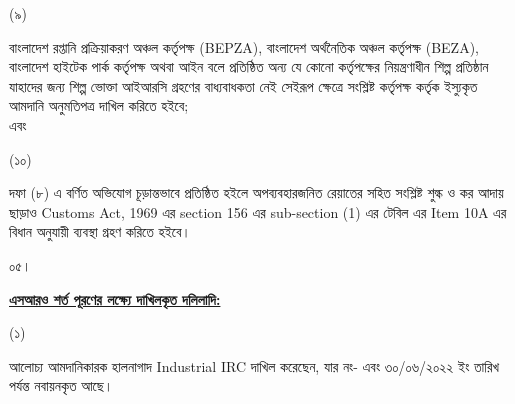 \documentclass[12pt]{article}
\newcommand{\ircno}{\jealirc}
\newcommand{\ircrenewdt}{৩০/০৬/২০২২ ইং}
\begin{document}
\begin{minipage}[t]{0.05\linewidth}
\hspace{1em}
\end{minipage}
\begin{minipage}[t]{0.05\linewidth}
(৯)
\end{minipage}
\begin{minipage}[t]{0.9\linewidth}
বাংলাদেশ রপ্তানি প্রক্রিয়াকরণ অঞ্চল কর্তৃপক্ষ (BEPZA),
বাংলাদেশ অর্থনৈতিক অঞ্চল কর্তৃপক্ষ (BEZA),
বাংলাদেশ হাইটেক পার্ক কর্তৃপক্ষ অথবা আইন বলে প্রতিষ্ঠিত
অন্য যে কোনো কর্তৃপক্ষের নিয়ন্ত্রণাধীন শিল্প প্রতিষ্ঠান যাহাদের জন্য শিল্প ভোক্তা আইআরসি গ্রহণের বাধ্যবাধকতা নেই সেইরূপ
ক্ষেত্রে সংশ্লিষ্ট কর্তৃপক্ষ কর্তৃক ইস্যুকৃত আমদানি অনুমতিপত্র
দাখিল করিতে হইবে;
\\
এবং
\\
\end{minipage}
\begin{minipage}[t]{0.05\linewidth}
\hspace{1em}
\end{minipage}
\begin{minipage}[t]{0.05\linewidth}
(১০)
\end{minipage}
\begin{minipage}[t]{0.9\linewidth}
দফা (৮) এ বর্ণিত অভিযোগ চূড়ান্তভাবে প্রতিষ্ঠিত হইলে
অপব্যবহারজনিত রেয়াতের সহিত সংশ্লিষ্ট শুল্ক ও কর আদায়
ছাড়াও Customs Act, 1969 এর section 156 এর
sub-section (1) এর টেবিল এর Item 10A এর বিধান
অনুযায়ী ব্যবস্থা গ্রহণ করিতে হইবে।
\\
\end{minipage}
\begin{minipage}[t]{0.05\linewidth}
০৫।
\end{minipage}
\begin{minipage}[t]{0.95\linewidth}
\underline{\textbf{এসআরও শর্ত পূরণের লক্ষ্যে
দাখিলকৃত দলিলাদি:}}
\end{minipage}
\begin{minipage}[t]{0.05\linewidth}
\hspace{0em}
\end{minipage}
\begin{minipage}[t]{0.05\linewidth}
(১)
\end{minipage}
\begin{minipage}[t]{0.90\linewidth}
আলোচ্য আমদানিকারক হালনাগাদ Industrial IRC
দাখিল করেছেন, যার নং- {\ircno} এবং
{\ircrenewdt} তারিখ পর্যন্ত নবায়নকৃত আছে।
\end{minipage}
\begin{minipage}[t]{0.05\linewidth}
\hspace{0em}
\end{minipage}
\end{document}
